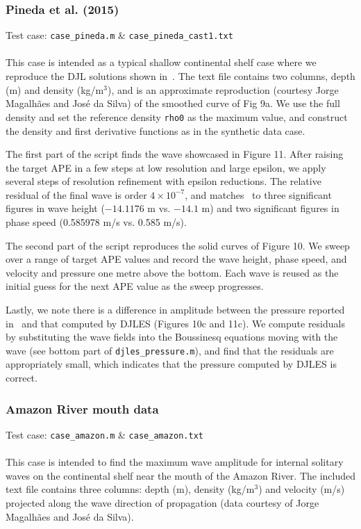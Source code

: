 \documentclass[letterpaper]{article}
\begin{document}
\subsubsection{Pineda et al. (2015)}
Test case: \verb"case_pineda.m" \&  \verb"case_pineda_cast1.txt" \\\\
This case is intended as a typical shallow continental shelf case where we reproduce the DJL solutions shown in~\cite{PinedaEtAl2015}.
The text file contains two columns, depth (m) and density (kg/m$^3$), and is an approximate reproduction (courtesy Jorge Magalh\~aes and Jos\'e da Silva) of the smoothed curve of Fig 9a.
We use the full density and set the reference density \verb+rho0+ as the maximum value, and construct the density and first derivative functions as in the synthetic data case.

The first part of the script finds the wave showcased in Figure 11.
After raising the target APE in a few steps at low resolution and large epsilon, we apply several steps of resolution refinement with epsilon reductions.
The relative residual of the final wave is order $4\times 10^{-7}$, and matches~\cite{PinedaEtAl2015} to three significant figures in wave height ($-14.1176$ m vs. $-14.1$ m) and two significant figures in phase speed (0.585978 m/s vs. 0.585 m/s).

The second part of the script reproduces the solid curves of Figure 10.
We sweep over a range of target APE values and record the wave height, phase speed, and velocity and pressure one metre above the bottom.
Each wave is reused as the initial guess for the next APE value as the sweep progresses. 

Lastly, we note there is a difference in amplitude between the pressure reported in~\cite{PinedaEtAl2015} and that computed by DJLES (Figures 10c and 11c).
We compute residuals by substituting the wave fields into the Boussinesq equations moving with the wave (see bottom part of \verb+djles_pressure.m+), and find that the residuals are appropriately small, which indicates that the pressure computed by DJLES is correct.

\subsubsection{Amazon River mouth data}
Test case: \verb"case_amazon.m" \&  \verb"case_amazon.txt" \\\\
This case is intended to find the maximum wave amplitude for internal solitary waves on the continental shelf near the mouth of the Amazon River.
The included text file contains three columns: depth (m), density (kg/m$^3$) and velocity (m/s) projected along the wave direction of propagation (data courtesy of Jorge Magalh\~aes and Jos\'e da Silva).
\end{document}
